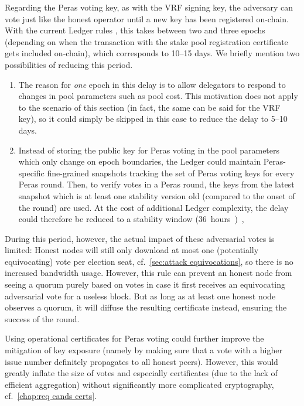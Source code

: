 Regarding the Peras voting key, as with the VRF signing key, the adversary can vote just like the honest operator until a new key has been registered on-chain.
With the current Ledger rules \parencite[Section 9.4 \enquote{Stake Pool Rules}]{shelley-ledger-specs}, this takes between two and three epochs (depending on when the transaction with the stake pool registration certificate gets included on-chain), which corresponds to \numrange{10}{15} days.
We briefly mention two possibilities of reducing this period.
\begin{enumerate}
\item
  The reason for \emph{one} epoch in this delay is to allow delegators to respond to changes in pool parameters such as pool cost.
  This motivation does not apply to the scenario of this section (in fact, the same can be said for the VRF key), so it could simply be skipped in this case to reduce the delay to \numrange{5}{10} days.
\item
  Instead of storing the public key for Peras voting in the pool parameters which only change on epoch boundaries, the Ledger could maintain Peras-specific fine-grained snapshots tracking the set of Peras voting keys for every Peras round.
  Then, to verify votes in a Peras round, the keys from the latest snapshot which is at least one stability version old (compared to the onset of the round) are used.
  At the cost of additional Ledger complexity, the delay could therefore be reduced to a stability window (\qty{36} hours),
\end{enumerate}

During this period, however, the actual impact of these adversarial votes is limited:
Honest nodes will still only download at most one (potentially equivocating) vote per election seat, cf.~\cref{sec:attack equivocations}, so there is no increased bandwidth usage.
However, this rule can prevent an honest node from seeing a quorum purely based on votes in case it first receives an equivocating adversarial vote for a useless block.
But as long as at least one honest node observes a quorum, it will diffuse the resulting certificate instead, ensuring the success of the round.

Using operational certificates for Peras voting could further improve the mitigation of key exposure (namely by making sure that a vote with a higher issue number definitely propagates to all honest peers).
However, this would greatly inflate the size of votes and especially certificates (due to the lack of efficient aggregation) without significantly more complicated cryptography, cf.~\cref{chap:req cands certs}.

